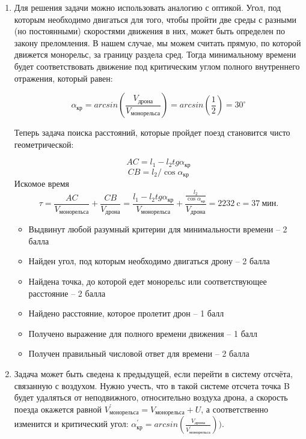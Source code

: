 \begin{enumerate}
    \item Для решения задачи можно использовать аналогию с оптикой. Угол, под которым необходимо двигаться для того, чтобы пройти две среды с разными (но постоянными) скоростями движения в них, может быть определен по закону преломления. В нашем случае, мы можем считать прямую, по которой движется монорельс, за границу раздела сред. Тогда минимальному времени будет соответствовать движение под критическим углом полного внутреннего отражения, который равен:
    
    $$\alpha_\text{кр}=arcsin\left( \frac{V_\text{дрона}}{V_\text{монорельса}}\right)=arcsin\left(\frac{1}{2}\right)=30^\circ$$ 

    Теперь задача поиска расстояний, которые пройдет поезд становится чисто геометрической:

    
    $$AC= l_1-l_2  tg\alpha_\text{кр}$$
    $$CB= l_2/\cos\alpha_\text{кр}$$ 
    Искомое время 
    $$\tau =\frac{AC}{V_\text{монорельса}} + \frac{CB}{V_\text{дрона}} =\frac{l_1-l_2  tg\alpha_\text{кр}}{V_\text{монорельса}} +\frac{\frac{l_2}{\cos\alpha_\text{кр}}}{V_\text{дрона}} =2232 \: \text{c}=37 \: \text{мин}.$$


    \markSection

    \begin{itemize}
        \item Выдвинут любой разумный критерии для минимальности времени – 2 балла
        \item Найден угол, под которым необходимо двигаться дрону – 2 балла
        \item Найдена точка, до которой едет монорельс или соответствующее расстояние – 2 балла
        \item Найдено расстояние, которое пролетит дрон – 1 балл
        \item Получено выражение для полного времени движения – 1 балл
        \item Получен правильный числовой ответ для времени – 2 балла
    \end{itemize}

    \item Задача может быть сведена к предыдущей, если перейти в систему отсчёта, связанную с воздухом. Нужно учесть, что в такой системе отсчета точка B будет удаляться от неподвижного, относительно воздуха дрона, а скорость поезда окажется равной $V_\text{монорельса}^\prime= V_\text{монорельса} +U$, а соответственно изменится и критический угол: $\alpha_\text{кр}^\prime=arcsin\left(\frac{V_\text{дрона}}{V_\text{монорельса}^\prime}\right))$.
 

\end{enumerate}
